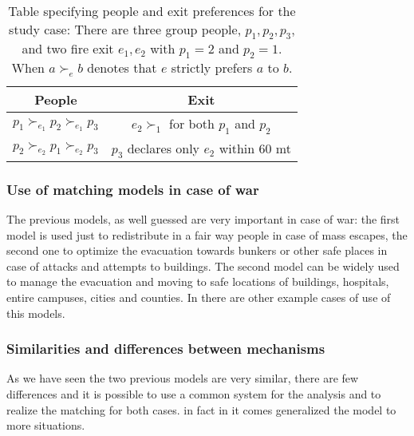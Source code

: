 \documentclass[letterpaper]{article} %
\begin{document}
    \begin{table}[!htb]
        \begin{tabular}{c|c}
            \hline People                                             & Exit                                                       \\
            \hline\( p_{1} \succ_{e_{1}} p_{2} \succ_{e_{1}} p_{3} \) & \( e_{2} \succ_{1} \) for both \( p_{1} \) and \( p_{2} \) \\
            \( p_{2} \succ_{e_{2}} p_{1} \succ_{e_{2}} p_{3} \)       & \( p_{3} \) declares only \( e_{2} \) within 60 mt         \\
            \hline
        \end{tabular}
        \caption{Table specifying people and exit preferences for
        the study case: There are three group people, \( p _ { 1 } , p _ { 2 } , p _ { 3 } \), and two fire exit \( e _ { 1 } , e _ { 2 } \) with \( p _ { 1 } = 2 \) and \( p _ { 2 } = 1 \).
        When \( a \succ_{e} b \) denotes that \( e \) strictly prefers \( a \) to \( b \).}
        \label{tab:people-exit}
    \end{table}

    \subsubsection{Use of matching models in case of war}

    The previous models, as well guessed are very important in case of war: the first model is used just
    to redistribute in a fair way people in case of mass escapes, the second one to optimize the evacuation
    towards bunkers or other safe places in case of attacks and attempts to buildings.
    The second model can be widely used to manage the evacuation and moving to safe locations of buildings, hospitals, entire campuses, cities and counties.
    In \cite{delacretaz_2020,delacretaz_2019,delacretaz_2016}   there are other example cases of use of this models.

    \subsubsection{Similarities and differences between mechanisms}

    As we have seen the two previous models are very similar, there are few differences and it is possible to use a common system for the analysis and to realize the matching for both cases.
    in fact in \cite{delacretaz_2020} it comes generalized the model to more situations.
\end{document}
